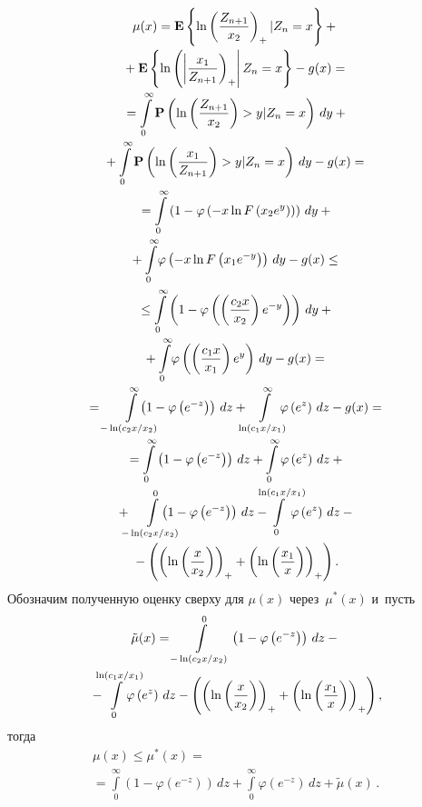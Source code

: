 \begin{multicols}{2}
\noindent
\begin{multline*}
\mu(x)={\bf E}\left\{\ln\left(\fr{Z_{n+1}}{x_2}\right)_+|Z_n=x\right\}+{}\\[-1pt]
{}+
{\bf E}\left\{\ln\left(\left\vert \fr{x_1}{Z_{n+1}}\right)_+
\right\vert Z_n=x\right\}-g(x)={}\\[-1pt]
{}=\int\limits_0^\infty{\bf P}
\left(\ln\left(\fr{Z_{n+1}}{x_2}\right)>y|Z_n=x\right)\,dy+{}\\[-1pt]
{}+
\int\limits_0^\infty{\bf P}\left(\ln\left(\fr{x_1}{Z_{n+1}}\right)>y|Z_n=x\right)\,dy-
g(x)={}\\[-1pt]
{}=\int\limits_0^\infty\left(1-\varphi\left(-x\ln F\left(x_2e^y\right)\right)\right)\,dy+{}\\[-1pt]
{}+
\int\limits_0^\infty\!\varphi\left(-x\ln F\left(x_1e^{-y}\right)\right)\,dy-
g(x)\le{}\\ %
{}\le\int\limits_0^\infty
\left(1-\varphi\left(\left(\fr{c_2x}{x_2}\right)e^{-y}\right)\right)\,dy+{}\\[-1pt]
{}+
\int\limits_0^\infty\!\varphi\left(\left(\fr{c_1x}{x_1}\right)e^y\right)\,dy-g(x)={}\\[-1pt]
{}=\int\limits_{-\ln(c_2x/x_2)}^\infty\hspace*{-6mm}
\left(1-\varphi\left(e^{-z}\right)\right)\,dz+\hspace*{-2mm}
\int\limits_{\ln(c_1x/x_1)}^\infty\hspace*{-3mm}\varphi\left(e^z\right)\,dz-g(x)={}\\[-1pt]
{}=\int\limits_0^\infty\left(1-\varphi\left(e^{-z}\right)\right)\,dz+
\int\limits_0^\infty\varphi\left(e^z\right)\,dz+{}\\[-1pt]
{}+  \hspace*{-2mm}
\int\limits_{-\ln(c_2x/x_2)}^0\hspace*{-6mm} \left(1-\varphi\left(e^{-z}\right)\right)\,dz-
\hspace*{-4mm}\int\limits_0^{\ln(c_1x/x_1)}\hspace*{-4mm}\varphi\left(e^z\right)\,dz-{}\\[-1pt]
{}-\left(\left(\ln\left(\fr{x}{x_2}\right)\right)_+
+\left(\ln\left(\fr{x_1}{x}\right)\right)_+\right).
\end{multline*}
Обозначим полученную оценку сверху для $\mu(x)$ через~$\mu^*(x)$ и~пусть
\begin{multline*}
{\tilde\mu}(x)=\int\limits_{-\ln(c_2x/x_2)}^0
\left(1-\varphi\left(e^{-z}\right)\right)\,dz-{}\\
{}-\hspace*{-9.46472pt}\int\limits_0^{\ln(c_1x/x_1)}\hspace*{-4.5mm}\varphi
\left(e^z\right)\,dz
-\left(\left(\ln\left(\fr{x}{x_2}\right)\right)_+
+\left(\ln\left(\fr{x_1}{x}\right)\right)_+\right),
\end{multline*}
тогда
\begin{multline}
\label{formmu}
\mu(x)\le \mu^*(x)={}\\
{}=\int\limits_0^\infty
\left(1-\varphi\left(e^{-z}\right)\right)\,dz+
\int\limits_0^\infty\!\varphi\left(e^{-z}\right)\,dz+{\tilde\mu}(x)\,.
\end{multline}


\end{multicols}
